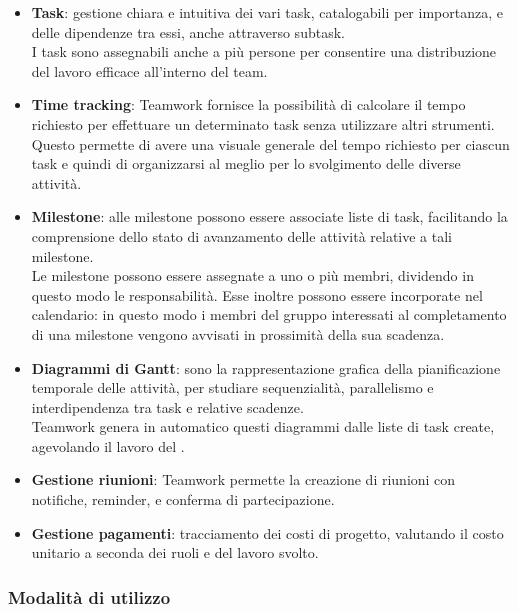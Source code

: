 \begin{itemize}
	\item \textbf{Task}:
	gestione chiara e intuitiva dei vari task, catalogabili per importanza, e delle dipendenze tra essi, anche attraverso subtask.\\
	I task sono assegnabili anche a più persone per consentire una distribuzione del lavoro efficace all'interno del team.
	
	\item \textbf{Time tracking}:
	Teamwork fornisce la possibilità di calcolare il tempo richiesto per effettuare un determinato task senza utilizzare altri strumenti. Questo permette di avere una visuale generale del tempo richiesto per ciascun task e quindi di organizzarsi al meglio per lo svolgimento delle diverse attività.
	
	\item \textbf{Milestone}:
	alle milestone possono essere associate liste di task, facilitando la comprensione dello stato di avanzamento delle attività relative a tali milestone.\\
	Le milestone possono essere assegnate a uno o più membri, dividendo in questo modo le responsabilità. Esse inoltre possono essere incorporate nel calendario: in questo modo i membri del gruppo interessati al completamento di una milestone vengono avvisati in prossimità della sua scadenza.
	
	\item \textbf{Diagrammi di Gantt}:	
	sono la rappresentazione grafica della pianificazione temporale delle attività, per studiare sequenzialità, parallelismo e interdipendenza tra task e relative scadenze.\\
	Teamwork genera in automatico questi diagrammi dalle liste di task create, agevolando il lavoro del \Responsabile.
	
	\item \textbf{Gestione riunioni}:
	Teamwork permette la creazione di riunioni con notifiche, reminder, e conferma di partecipazione.
	
	\item \textbf{Gestione pagamenti}:
	tracciamento dei costi di progetto, valutando il costo unitario a seconda dei ruoli e del lavoro svolto.
\end{itemize}

\newpage
\subsubsection{Modalità di utilizzo} \label{sec:procedure_teamwork}

